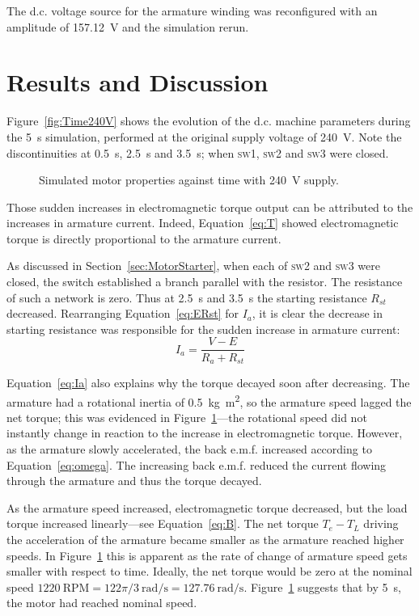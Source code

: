 \documentclass[a4paper,11pt,twocolumn]{article}
\newcommand{\s}{\si{\second}\xspace}
\newcommand{\V}{\si{\volt}\xspace}
\newcommand{\rps}{\si{\radian\per\second}\xspace}
\newcommand{\kgmm}{\si{\kilogram\square\metre}\xspace}
\newcommand{\RPM}{\text{RPM}\xspace}
\newcommand{\DC}{d.c.\xspace}
\newcommand{\EMF}{e.m.f.\xspace}
\newcommand{\SW}[1]{\textsc{sw\footnotesize#1}\xspace}
\begin{document}
The \DC voltage source for the armature winding was reconfigured with an 
amplitude of 157.12~\V and the simulation rerun.

\section{Results and Discussion}

Figure~\vref{fig:Time240V} shows the evolution of the \DC machine parameters 
during the 5~\s simulation, performed at the original supply voltage of 240~\V.
Note the discontinuities at 0.5~\s, 2.5~\s and 3.5~\s; when \SW{1}, \SW{2} and
\SW{3} were closed.
\begin{figure}[t]
    \centering
    \def\svgwidth{0.75\textwidth}
    
    \caption{Simulated motor properties against time with 240~\V supply.}
    \label{fig:Time240V}
\end{figure}

Those sudden increases in electromagnetic torque output can be attributed to 
the increases in armature current. Indeed, Equation~\ref{eq:T} showed 
electromagnetic torque is directly proportional to the armature current.

As discussed in Section~\ref{sec:MotorStarter}, when each of \SW{2} and \SW{3} 
were closed, the switch established a branch parallel with the resistor. The 
resistance of such a network is zero. Thus at 2.5~\s and 3.5~\s the starting 
resistance $R_{st}$ decreased. Rearranging Equation~\ref{eq:ERst} for $I_a$, it 
is clear the decrease in starting resistance was responsible for the sudden 
increase in armature current:
\begin{equation} \label{eq:Ia}
    I_a = \frac{V - E}{R_a + R_{st}}
\end{equation}

Equation~\ref{eq:Ia} also explains why the torque decayed soon after 
decreasing. The armature had a rotational inertia of 0.5~\kgmm, so the armature 
speed lagged the net torque; this was evidenced in 
Figure~\ref{fig:Time240V}---the rotational speed did not instantly change in 
reaction to the increase in electromagnetic torque. However, as the armature 
slowly accelerated, the back \EMF increased according to 
Equation~\ref{eq:omega}. The increasing back \EMF reduced the current flowing 
through the armature and thus the torque decayed.

As the armature speed increased, electromagnetic torque decreased, but the load 
torque increased linearly---see Equation~\ref{eq:B}. The net torque $T_e - T_L$ 
driving the acceleration of the armature became smaller as the armature reached 
higher speeds. In Figure~\ref{fig:Time240V} this is apparent as the rate of 
change of armature speed gets smaller with respect to time. Ideally, the net 
torque would be zero at the nominal speed $1220~\RPM = 122\pi/3~\rps = 
127.76~\rps$. Figure~\ref{fig:Time240V} suggests that by 5~\s, the motor had 
reached nominal speed.
\end{document}
